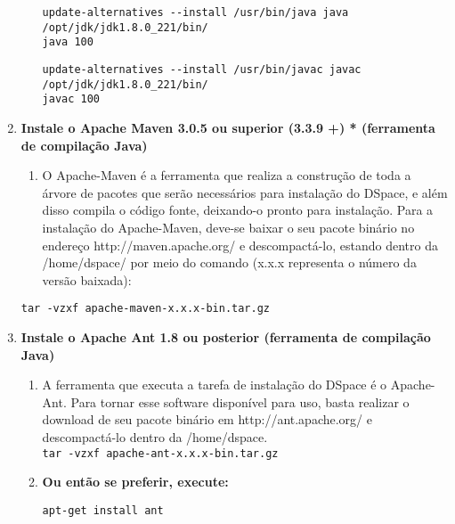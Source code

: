 \documentclass[12pt,hidelinks]{article}
\begin{document}
\begin{enumerate}
\begin{enumerate}
        \begin{verbatim}
update-alternatives --install /usr/bin/java java /opt/jdk/jdk1.8.0_221/bin/
java 100
        \end{verbatim}
        
        \begin{verbatim}
update-alternatives --install /usr/bin/javac javac /opt/jdk/jdk1.8.0_221/bin/
javac 100
        \end{verbatim}

        \end{enumerate}
     
        
    \item \textbf{Instale o Apache Maven 3.0.5 ou superior (3.3.9 +) * (ferramenta de compilação Java)}\\
        \begin{enumerate}
            \item O Apache-Maven é a ferramenta que realiza a construção de toda a árvore de pacotes que serão necessários para instalação do DSpace, e além disso compila o código fonte, deixando-o pronto para instalação. Para a instalação do Apache-Maven, deve-se baixar o seu pacote binário no endereço http://maven.apache.org/ e descompactá-lo, estando dentro da /home/dspace/ por meio do comando (x.x.x representa o número da versão baixada):
        \end{enumerate}
        
            \texttt{tar -vzxf apache-maven-x.x.x-bin.tar.gz}\\
        
        
    \item \textbf{ Instale o Apache Ant 1.8 ou posterior (ferramenta de compilação Java)}\\

         \begin{enumerate}
            \item A ferramenta que executa a tarefa de instalação do DSpace é o Apache-Ant. Para tornar esse software disponível para uso, basta realizar o download de seu pacote binário em http://ant.apache.org/ e descompactá-lo dentro da /home/dspace.\\
            
                \texttt{tar -vzxf apache-ant-x.x.x-bin.tar.gz}\\
            
            \item \textbf{Ou então se preferir, execute:}\\
                \begin{verbatim}
apt-get install ant
                \end{verbatim}
            

\end{enumerate}
\end{enumerate}
\end{document}
